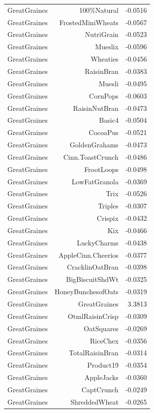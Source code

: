 \begin{longtable}{@{}lrr@{}}
GreatGraines & 100\%Natural & -0.0516 \\
GreatGraines & FrostedMiniWheats & -0.0567 \\
GreatGraines & NutriGrain & -0.0523 \\
GreatGraines & Mueslix & -0.0596 \\
GreatGraines & Wheaties & -0.0456 \\
GreatGraines & RaisinBran & -0.0383 \\
GreatGraines & Muesli & -0.0495 \\
GreatGraines & CornPops & -0.0603 \\
GreatGraines & RaisinNutBran & -0.0473 \\
GreatGraines & Basic4 & -0.0504 \\
GreatGraines & CocoaPus & -0.0521 \\
GreatGraines & GoldenGrahams & -0.0473 \\
GreatGraines & Cinn.ToastCrunch & -0.0486 \\
GreatGraines & FrootLoops & -0.0498 \\
GreatGraines & LowFatGranola & -0.0369 \\
GreatGraines & Trix & -0.0526 \\
GreatGraines & Triples & -0.0307 \\
GreatGraines & Crispix & -0.0432 \\
GreatGraines & Kix & -0.0466 \\
GreatGraines & LuckyCharms & -0.0438 \\
GreatGraines & AppleCinn.Cheerios & -0.0377 \\
GreatGraines & CracklinOatBran & -0.0398 \\
GreatGraines & BigBiscuitShdWt & -0.0325 \\
GreatGraines & HoneyBunchesofOats & -0.0319 \\
GreatGraines & GreatGraines & 3.3813 \\
GreatGraines & OtmlRaisinCrisp & -0.0309 \\
GreatGraines & OatSquares & -0.0269 \\
GreatGraines & RiceChex & -0.0356 \\
GreatGraines & TotalRaisinBran & -0.0314 \\
GreatGraines & Product19 & -0.0354 \\
GreatGraines & AppleJacks & -0.0360 \\
GreatGraines & CaptCrunch & -0.0249 \\
GreatGraines & ShreddedWheat & -0.0265 \\

\end{longtable}
